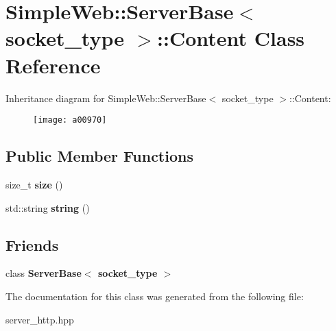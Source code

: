 \hypertarget{a00970}{}\section{Simple\+Web\+:\+:Server\+Base$<$ socket\+\_\+type $>$\+:\+:Content Class Reference}
\label{a00970}
Inheritance diagram for Simple\+Web\+:\+:Server\+Base$<$ socket\+\_\+type $>$\+:\+:Content\+:\begin{figure}[H]
\begin{center}
\leavevmode
\texttt{[image: a00970]}
\end{center}
\end{figure}
\subsection*{Public Member Functions}
\begin{DoxyCompactItemize}
\item 
\mbox{\label{a00970_adf8b2386c8ab32277341c6ae07cd4670}} 
size\+\_\+t {\bfseries size} ()
\item 
\mbox{\label{a00970_a6b4a72b0631c88ef576db28f54a768cb}} 
std\+::string {\bfseries string} ()
\end{DoxyCompactItemize}
\subsection*{Friends}
\begin{DoxyCompactItemize}
\item 
\mbox{\label{a00970_a01d54a7e16ca437c98ec571deca98dfc}} 
class {\bfseries Server\+Base$<$ socket\+\_\+type $>$}
\end{DoxyCompactItemize}


The documentation for this class was generated from the following file\+:\begin{DoxyCompactItemize}
\item 
server\+\_\+http.\+hpp\end{DoxyCompactItemize}
